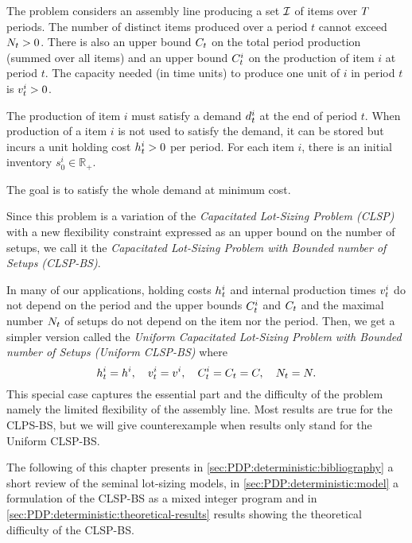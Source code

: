 \medskip

The problem considers an assembly line producing a set $\mathcal{I}$ of items over $T$ periods. The number of distinct items produced over a period $t$ cannot exceed $N_t>0$. There is also an upper bound $C_t$ on the total period production (summed over all items) and an upper bound $C_t^i$ on the production of item $i$ at period $t$. The capacity needed (in time units) to produce one unit of $i$ in period $t$ is $v_t^i>0$.

The production of item $i$ must satisfy a demand $d_t^i$ at the end of period $t$. When production of a item $i$ is not used to satisfy the demand, it can be stored but incurs a unit holding cost $h_t^i>0$ per period. For each item $i$, there is an initial inventory $s_0^i\in\mathbb{R}_+$.

The goal is to satisfy the whole demand at minimum cost.

Since this problem is a variation of the \emph{Capacitated Lot-Sizing Problem (CLSP)} with a new flexibility constraint expressed as an upper bound on the number of setups, we call it the \emph{Capacitated Lot-Sizing Problem with Bounded number of Setups (CLSP-BS)}.

In many of our applications, holding costs $h_t^i$ and internal production times $v_t^i$ do not depend on the period and the upper bounds $C_t^i$ and $C_t$ and the maximal number $N_t$ of setups do not depend on the item nor the period. Then, we get a simpler version called the \emph{Uniform Capacitated Lot-Sizing Problem with Bounded number of Setups (Uniform CLSP-BS)} where
\begin{equation}
  h_t^i=h^i,\quad
  v_t^i=v^i,\quad
  C_t^i=C_t=C,\quad
  N_t=N.
\end{equation}
This special case captures the essential part and the difficulty of the problem namely the limited flexibility of the assembly line. Most results are true for the CLPS-BS, but we will give counterexample when results only stand for the Uniform CLSP-BS.


\medskip

The following of this chapter presents in \cref{sec:PDP:deterministic:bibliography} a short review of the seminal lot-sizing models, in \cref{sec:PDP:deterministic:model} a formulation of the CLSP-BS as a mixed integer program and in \cref{sec:PDP:deterministic:theoretical-results} results showing the theoretical difficulty of the CLSP-BS.



